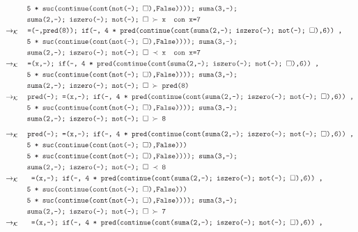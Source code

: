 \documentclass{article}
\newcommand{\tx}[1]{\textcolor{Black} {\texttt{#1}}}
\newcommand{\es}{$\square$}
\newcommand{\kr}{\rightarrow_{\mathcal{K}} \quad}
\begin{document}
\begin{enumerate}
\begin{enumerate}
\begin{align*}
			&\tx {\quad \quad \quad 5 * suc(continue(cont(not(-); \es),False)))); suma(3,-);}\\
			&\tx{\quad \quad \quad suma(2,-); iszero(-); not(-); \es $\ \succ $ x} \tx{\quad con x=7}\\	
			&\kr \tx{=(-,pred(8)); if(-, 4 * pred(continue(cont(suma(2,-); iszero(-); not(-); \es),6)) ,}\\
			&\tx {\quad \quad \quad 5 * suc(continue(cont(not(-); \es),False)))); suma(3,-);}\\
			&\tx{\quad \quad \quad suma(2,-); iszero(-); not(-); \es $\ \prec $ x} \tx{\quad con x=7}\\	
			&\kr \tx{=(x,-); if(-, 4 * pred(continue(cont(suma(2,-); iszero(-); not(-); \es),6)) ,}\\
			&\tx {\quad \quad \quad 5 * suc(continue(cont(not(-); \es),False)))); suma(3,-);}\\
			&\tx{\quad \quad \quad suma(2,-); iszero(-); not(-); \es $\ \succ $ pred(8)} \\
			&\kr \tx{pred(-); =(x,-); if(-, 4 * pred(continue(cont(suma(2,-); iszero(-); not(-); \es),6)) ,}\\
			&\tx {\quad \quad \quad 5 * suc(continue(cont(not(-); \es),False)))); suma(3,-);}\\
			&\tx{\quad \quad \quad suma(2,-); iszero(-); not(-); \es $\ \succ $ 8} \\
			\end{align*}
			\begin{align*}
			&\kr \tx{pred(-); =(x,-); if(-, 4 * pred(continue(cont(suma(2,-); iszero(-); not(-); \es),6)) ,}\\
			&\tx{\quad \quad \quad 5 * suc(continue(cont(not(-); \es),False)))}\\
			&\tx {\quad \quad \quad 5 * suc(continue(cont(not(-); \es),False)))); suma(3,-);}\\
			&\tx{\quad \quad \quad suma(2,-); iszero(-); not(-); \es $\ \prec $ 8} \\
			&\kr \tx{ =(x,-); if(-, 4 * pred(continue(cont(suma(2,-); iszero(-); not(-); \es),6)) ,}\\
			&\tx{\quad \quad \quad 5 * suc(continue(cont(not(-); \es),False)))}\\
			&\tx {\quad \quad \quad 5 * suc(continue(cont(not(-); \es),False)))); suma(3,-);}\\
			&\tx{\quad \quad \quad suma(2,-); iszero(-); not(-); \es $\ \succ $ 7} \\
			&\kr \tx{ =(x,-); if(-, 4 * pred(continue(cont(suma(2,-); iszero(-); not(-); \es),6)) ,}\\

\end{align*}
\end{enumerate}
\end{enumerate}
\end{document}
